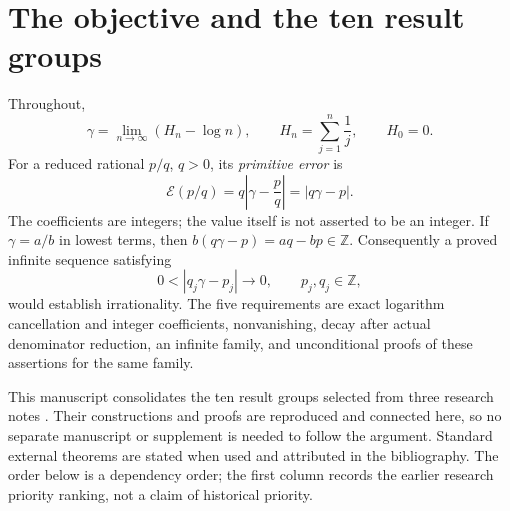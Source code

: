 \documentclass[11pt,a4paper]{article}
\theoremstyle{definition}
\theoremstyle{remark}
\begin{document}
\clearpage
\tableofcontents
\clearpage

\section{The objective and the ten result groups}
Throughout,
\[
 \gamma=\lim_{n\to\infty}(H_n-\log n),\qquad
 H_n=\sum_{j=1}^n\frac1j,\qquad H_0=0.
\]
For a reduced rational \(p/q\), \(q>0\), its \emph{primitive error} is
\[
 \mathcal E(p/q)=q\left|\gamma-\frac pq\right|=|q\gamma-p|.
\]
The coefficients are integers; the value itself is not asserted to be
an integer. If \(\gamma=a/b\) in lowest terms, then
\(b(q\gamma-p)=aq-bp\in\mathbb Z\). Consequently a proved infinite
sequence satisfying
\[
 0<|q_j\gamma-p_j|\longrightarrow0,\qquad p_j,q_j\in\mathbb Z,
\]
would establish irrationality. The five requirements are exact logarithm
cancellation and integer coefficients, nonvanishing, decay after actual
denominator reduction, an infinite family, and unconditional proofs of
these assertions for the same family.

This manuscript consolidates the ten result groups selected from three
research notes \cite{source-a,source-b,source-c}. Their constructions and
proofs are reproduced and connected here, so no separate manuscript or
supplement is needed to follow the argument. Standard external theorems
are stated when used and attributed in the bibliography. The order below
is a dependency order; the first column records the earlier research
priority ranking, not a claim of historical priority.
\end{document}
